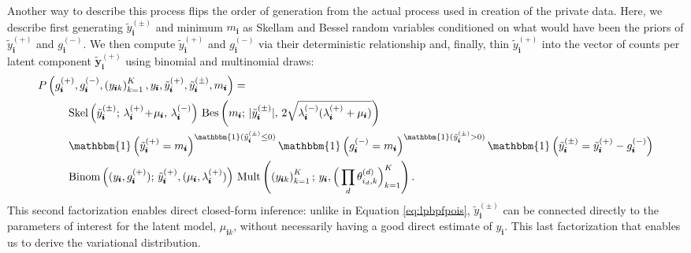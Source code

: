 \documentclass{article}
\newcommand{\subs}{\pmb{i}}
\newcommand{\wsup}[2]{#1_{\subs}^{(#2)}}
\newcommand{\ytP}{\wsup{\tilde{y}}{+}}
\newcommand{\ytPM}{\wsup{\tilde{y}}{\pm}}
\newcommand{\ysk}{y_{\subs k}}
\newcommand{\ys}{y_{\subs}}
\newcommand{\lamP}{\wsup{\lambda}{+}}
\newcommand{\lamM}{\wsup{\lambda}{-}}
\newcommand{\gP}{\wsup{g}{+}}
\newcommand{\gM}{\wsup{g}{-}}
\newcommand{\musk}{\mu_{\subs k}}
\newcommand{\ms}{m_{\subs}}
\newcommand{\yvtP}{\boldsymbol{\tilde{y}}_{\subs}^{(+)}}
\newcommand{\tp}{\!+\!}
\begin{document}
Another way to describe this process flips the order of generation from the
actual process used in creation of the private data. Here, we describe first
generating $\ytPM$ and minimum $\ms$ as Skellam and Bessel random variables
conditioned on what would have been the priors of $\ytP$ and $\gM$. We then
compute $\ytP$ and $\gM$ via their deterministic relationship and, finally, thin
$\ytP$ into the vector of counts per latent component $\yvtP$ using binomial and
multinomial draws:
\begin{align}
    P &\left(\gP, \gM, \left(\ysk\right)_{k=1}^K, \ys,
    \ytP, \ytPM, \ms\right) = \notag \\
  &\quad\quad \text{Skel}\left(\ytPM;\, \lamP \tp \mu_{\subs},\, \lamM\right)\, \text{Bes}\left(\ms;\, |\ytPM|,\,2\sqrt{\lamM(\lamP+\mu_{\subs})}\right)\notag\\
  &\quad\quad \mathbbm{1} \left(\ytP=\ms\right)^{\mathbbm{1}(\ytPM \leq 0)} \mathbbm{1} \left(\gM=\ms\right)^{\mathbbm{1}(\ytPM > 0)} \mathbbm{1}\left(\ytPM = \ytP - \gM\right)\notag\\
  &\quad\quad \text{Binom}\left((\ys, \gP);\, \ytP, (\mu_{\subs}, \lamP)\right) \,  \text{Mult}\left(\left(\ysk\right)_{k=1}^K;\, \ys, \Big( \prod_d \theta_{i_d,k}^{(d)} \Big)_{k=1}^K\right).
\label{eqn:finalfact}
\end{align}
This second factorization enables direct closed-form inference: unlike in
  Equation \ref{eq:lpbpfpois}, $\ytPM$ can be connected directly to the
  parameters of interest for the latent model, $\musk$, without necessarily
  having a good direct estimate of $\ys$. This last factorization that
  enables us to derive the variational distribution.

\end{document}
